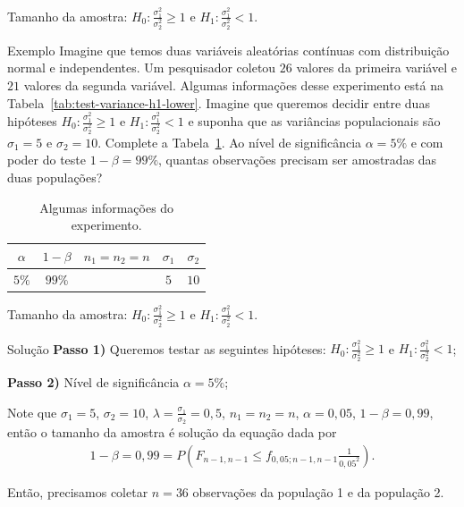 \documentclass[9pt]{beamer}
\begin{document}
\begin{frame}{Tamanho da amostra: $H_0:\frac{\sigma_1^2}{\sigma_2^2} \geq 1$ e $H_1:\frac{\sigma_1^2}{\sigma_2^2} < 1$.}

\begin{block}{Exemplo}
	Imagine que temos duas variáveis aleatórias contínuas com distribuição normal e independentes. Um pesquisador coletou $26$ valores da primeira variável e $21$ valores da segunda variável. Algumas informações desse experimento está na Tabela~\ref{tab:test-variance-h1-lower}. Imagine que queremos decidir entre duas hipóteses $H_0: \frac{\sigma_1^2}{\sigma_2^2} \geq 1$ e $H_1: \frac{\sigma_1^2}{\sigma_2^2} < 1$ e suponha que as variâncias populacionais são $\sigma_1 = 5$  e $\sigma_2 = 10$. Complete a Tabela~\ref{tab:test-variance-h1-lower-sample-size}. Ao nível de significância $\alpha=5\%$ e com poder do teste $1-\beta=99\%$, quantas observações precisam ser amostradas das duas populações?
	\begin{table}[htbp]
		\centering
		\begin{tabular}{c|c|c|c|c}
			\toprule[0.05cm]
			$\alpha$ & $1-\beta$ & $n_1=n_2 = n$ & $\sigma_1$ & $\sigma_2$\\
			\midrule[0.025cm]
			$5\%$ & $99\%$ &  & $5$ & $10$ \\
			\bottomrule[0.05cm]
		\end{tabular}
		\caption{Algumas informações do experimento.}
		\label{tab:test-variance-h1-lower-sample-size}
	\end{table}
\end{block}
\end{frame}

\begin{frame}{Tamanho da amostra: $H_0:\frac{\sigma_1^2}{\sigma_2^2} \geq 1$ e $H_1:\frac{\sigma_1^2}{\sigma_2^2} < 1$.}

\begin{block}{Solução}
	\textbf{Passo 1)} Queremos testar as seguintes hipóteses: $H_0: \frac{\sigma_1^2}{\sigma_2^2} \geq 1$ e $H_1: \frac{\sigma_1^2}{\sigma_2^2} < 1$;

	\textbf{Passo 2)} Nível de significância $\alpha=5\%$;
	
	Note que $\sigma_1=5$, $\sigma_2=10$, $\lambda =  \frac{\sigma_1}{\sigma_2} = 0,5$, $n_1 = n_2 = n$, $\alpha=0,05$, $1-\beta=0,99$, então o tamanho da amostra é solução da equação dada por
	\begin{align*}
	1-\beta =0,99 = P\left(F_{n-1, n-1} \leq f_{0,05;n-1, n-1}  \frac{1}{0,05^2}\right).
	\end{align*}	
	
	Então, precisamos coletar $n=36$ observações da população 1 e da população 2.
\end{block}

\end{frame}
\end{document}
